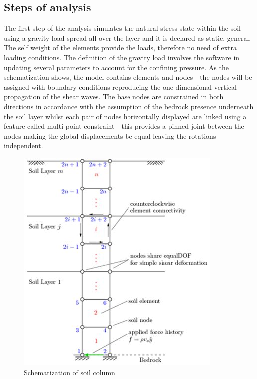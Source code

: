 \documentclass[10pt,a4paper]{report}
\begin{document}
\subsection{Steps of analysis}
The first step of the analysis simulates the natural stress state within the soil using a gravity load spread all over the layer and it is declared as static, general. The self weight of the elements provide the loads, therefore no need of extra loading conditions. The definition of the gravity load involves the software in updating several parameters to account for the confining pressure. As the schematization shows, the model contains elements and nodes - the nodes will be assigned with boundary conditions reproducing the one dimensional vertical propagation of the shear waves. The base nodes are constrained in both directions in accordance with the assumption of the bedrock presence underneath the soil layer whilst each pair of nodes horizontally displayed are linked using a feature called multi-point constraint - this provides a pinned joint between the nodes making the global displacements be equal leaving the rotations independent. 

\begin{figure}
	\centering
	\includegraphics[width=0.7\linewidth]{"Soil column"}
	\caption[]{Schematization of soil column}
	\label{Soilcolumn}
\end{figure}
\end{document}

